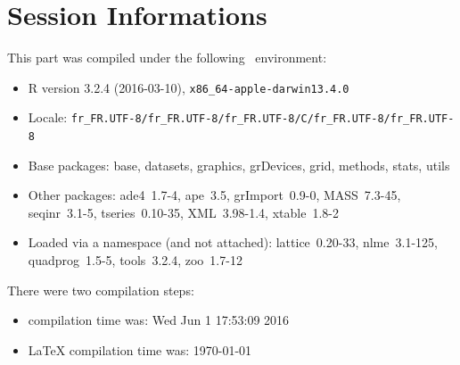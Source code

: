 \documentclass{article}
\begin{document}
\section*{Session Informations}

\begin{scriptsize}

This part was compiled under the following \Rlogo{}~environment:

\begin{itemize}\raggedright
  \item R version 3.2.4 (2016-03-10), \verb|x86_64-apple-darwin13.4.0|
  \item Locale: \verb|fr_FR.UTF-8/fr_FR.UTF-8/fr_FR.UTF-8/C/fr_FR.UTF-8/fr_FR.UTF-8|
  \item Base packages: base, datasets, graphics, grDevices, grid,
    methods, stats, utils
  \item Other packages: ade4~1.7-4, ape~3.5, grImport~0.9-0,
    MASS~7.3-45, seqinr~3.1-5, tseries~0.10-35, XML~3.98-1.4,
    xtable~1.8-2
  \item Loaded via a namespace (and not attached): lattice~0.20-33,
    nlme~3.1-125, quadprog~1.5-5, tools~3.2.4, zoo~1.7-12
\end{itemize}
There were two compilation steps:

\begin{itemize}
  \item \Rlogo{} compilation time was: Wed Jun  1 17:53:09 2016
  \item \LaTeX{} compilation time was: \today
\end{itemize}

\end{scriptsize}

%
%
\clearpage
{}


\end{document}
